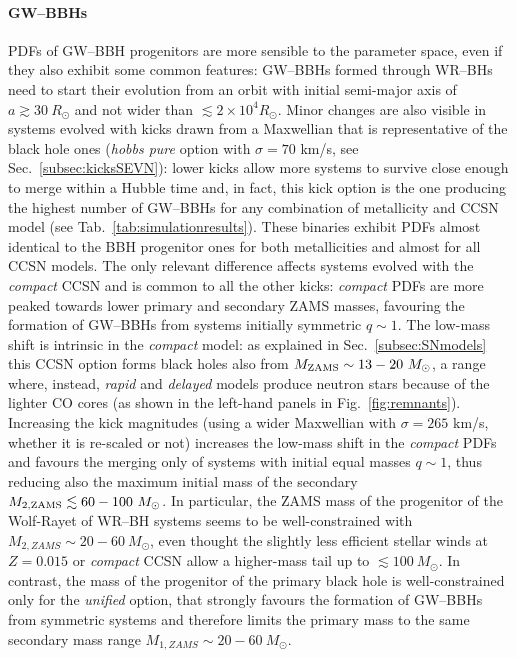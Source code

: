 \documentclass[a4paper,titlepage]{book}     	%
\newcommand{\sun}{\ensuremath{_\odot}}
\newcommand{\mzams}{M_\textup{ZAMS}}
\newcommand{\msun}{\ensuremath{M\sun}}
\newcommand{\rsun}{R_{\odot}}
\begin{document}
\paragraph{GW--BBHs} PDFs of GW--BBH progenitors are more sensible to the parameter space, even if they also exhibit some common features: GW--BBHs formed through WR--BHs need to start their evolution from an orbit with initial semi-major axis of $a \gtrsim 30~\rsun$ and not wider than $\lesssim 2 \times 10^4\rsun$. Minor changes are also visible in systems evolved with kicks drawn from a Maxwellian that is representative of the black hole ones (\emph{hobbs pure} option with $\sigma=70$ km/s, see Sec.\ \ref{subsec:kicksSEVN}): lower kicks allow more systems to survive close enough to merge within a Hubble time and, in fact, this kick option is the one producing the highest number of GW--BBHs for any combination of metallicity and CCSN model (see Tab.\ \ref{tab:simulationresults}). These binaries exhibit PDFs almost identical to the BBH progenitor ones for both metallicities and almost for all CCSN models. The only relevant difference affects systems evolved with the \emph{compact} CCSN and is common to all the other kicks: \emph{compact} PDFs are more peaked towards lower primary and secondary ZAMS masses, favouring the formation of GW--BBHs from systems initially symmetric $q \sim 1$. The low-mass shift is intrinsic in the \emph{compact} model: as explained in Sec.\ \ref{subsec:SNmodels} this CCSN option forms black holes also from $\mzams \sim 13-20~\msun$, a range where, instead, \emph{rapid} and \emph{delayed} models produce neutron stars because of the lighter CO cores (as shown in the left-hand panels in Fig.\ \ref{fig:remnants}).\\

Increasing the kick magnitudes (using a wider Maxwellian with $\sigma = 265$ km/s, whether it is re-scaled or not) increases the low-mass shift in the \emph{compact} PDFs and favours the merging only of systems with initial equal masses $q \sim 1$, thus reducing also the maximum initial mass of the secondary $M_{\rm 2,ZAMS} \lesssim 60-100~\msun$. In particular, the ZAMS mass of the progenitor of the Wolf-Rayet of WR--BH systems seems to be well-constrained with $M_{2, ZAMS} \sim 20-60~\msun$, even thought the slightly less efficient stellar winds at $Z=0.015$ or \emph{compact} CCSN allow a higher-mass tail up to $\lesssim 100~\msun$. In contrast, the mass of the progenitor of the primary black hole is well-constrained only for the \emph{unified} option, that strongly favours the formation of GW--BBHs from symmetric systems and therefore limits the primary mass to the same secondary mass range $M_{1, ZAMS} \sim 20-60~\msun$.
\end{document}
